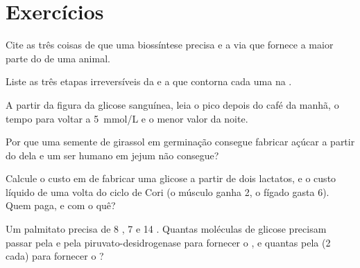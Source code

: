 \section{Exercícios}

\begin{exercise}[$\star$]\label{exo:b1:biosyntheses-integration:1}
Cite as três coisas de que uma biossíntese precisa e a via que fornece a
maior parte do  de uma  animal.
\end{exercise}

\begin{exercise}[$\star$]\label{exo:b1:biosyntheses-integration:2}
Liste as três etapas irreversíveis da  e a  que contorna
cada uma na .
\end{exercise}

\begin{exercise}[$\star$]\label{exo:b1:biosyntheses-integration:3}
A partir da figura da glicose sanguínea, leia o pico depois do café da
manhã, o tempo para voltar a \qty{5}{mmol/L} e o menor valor da noite.
\end{exercise}

\begin{exercise}[$\star$]\label{exo:b1:biosyntheses-integration:4}
Por que uma semente de girassol em germinação consegue fabricar açúcar a
partir do  dela e um ser humano em jejum não consegue?
\end{exercise}

\begin{exercise}[$\star\star$]\label{exo:b1:biosyntheses-integration:5}
Calcule o custo em  de fabricar uma glicose a partir de dois
lactatos, e o custo líquido de uma volta do ciclo de Cori (o músculo
ganha 2, o fígado gasta 6). Quem paga, e com o quê?
\end{exercise}

\begin{exercise}[$\star\star$]\label{exo:b1:biosyntheses-integration:6}
Um palmitato precisa de 8 , 7  e 14 . Quantas
moléculas de glicose precisam passar pela  e pela
piruvato-desidrogenase para fornecer o , e quantas pela  (2  cada) para fornecer o ?
\end{exercise}

